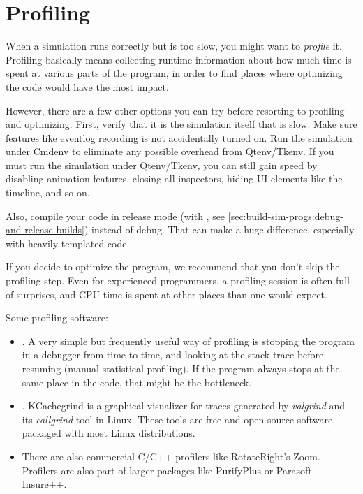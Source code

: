 \section{Profiling}
\label{sec:run-sim:profiling}

When a simulation runs correctly but is too slow, you might want to
\textit{profile} it. Profiling basically means collecting runtime
information about how much time is spent at various parts of the
program, in order to find places where optimizing the code would have 
the most impact.

However, there are a few other options you can try before resorting to profiling
and optimizing. First, verify that it  is the simulation itself that is slow.
Make sure features like eventlog recording is not accidentally turned on. Run
the simulation under Cmdenv to eliminate any possible overhead from Qtenv/Tkenv.
If you must run the simulation under Qtenv/Tkenv, you can still gain speed by
disabling animation features, closing all inspectors, hiding UI elements like
the timeline, and so on.

Also, compile your code in release mode (with , see
\ref{sec:build-sim-progs:debug-and-release-builds}) instead of debug. That
can make a huge difference, especially with heavily templated code.

\begin{hint}
If you decide to optimize the program, we recommend that you don't skip the
profiling step. Even for experienced programmers, a profiling session is often
full of surprises, and CPU time is spent at other places than one would
expect.
\end{hint}

Some profiling software:

\begin{itemize}
  \item {}. A very simple but frequently useful way of profiling is
        stopping the program in a debugger from time to time, and looking at the
        stack trace before resuming (manual statistical profiling). If
        the program always stops at the same place in the code, that might be
        the bottleneck.
  \item {}. KCachegrind is a graphical visualizer
        for traces generated by \textit{valgrind} and its \textit{callgrind}
        tool in Linux. These tools are free and open source software,
        packaged with most Linux distributions. 
  \item There are also commercial C/C++ profilers like RotateRight's Zoom.
        Profilers are also part of larger packages like PurifyPlus or
        Parasoft Insure++.
\end{itemize}


